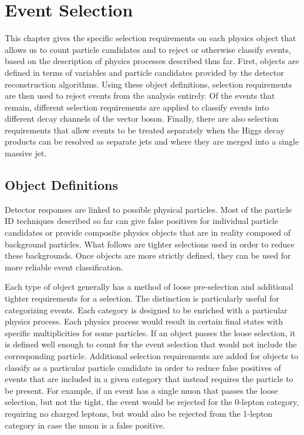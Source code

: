 \chapter{Event Selection} \label{ch:selection}

This chapter gives the specific selection requirements on each physics object
that allows us to count particle candidates and to reject or otherwise classify events,
based on the description of physics processes described thus far.
First, objects are defined in terms of variables and particle candidates provided by the
detector reconstruction algorithms.
Using these object definitions, selection requirements are then used to reject events
from the analysis entirely.
Of the events that remain, different selection requirements are applied to classify events
into different decay channels of the vector boson.
Finally, there are also selection requirements that allow events to be treated separately
when the Higgs decay products can be resolved as separate jets
and where they are merged into a single massive jet.

\section{Object Definitions}

Detector responses are linked to possible physical particles.
Most of the particle ID techniques described so far can give
false positives for individual particle candidates
or provide composite physics objects that are in reality composed of background particles.
What follows are tighter selections used in order to reduce these backgrounds.
Once objects are more strictly defined,
they can be used for more reliable event classification.

Each type of object generally has a method of loose pre-selection
and additional tighter requirements for a selection.
The distinction is particularly useful for categorizing events.
Each category is designed to be enriched with a particular physics process.
Each physics process would result in certain final states
with specific multiplicities for some particles.
If an object passes the loose selection, it is defined
well enough to count for the event selection that
would not include the corresponding particle.
Additional selection requirements are added for objects to classify
as a particular particle candidate in order to reduce false positives
of events that are included in a given category that instead requires the particle to be present.
For example, if an event has a single muon that passes the loose selection,
but not the tight, the event would be rejected for the 0-lepton category, requiring no charged leptons,
but would also be rejected from the 1-lepton category in case the muon is a false positive.


